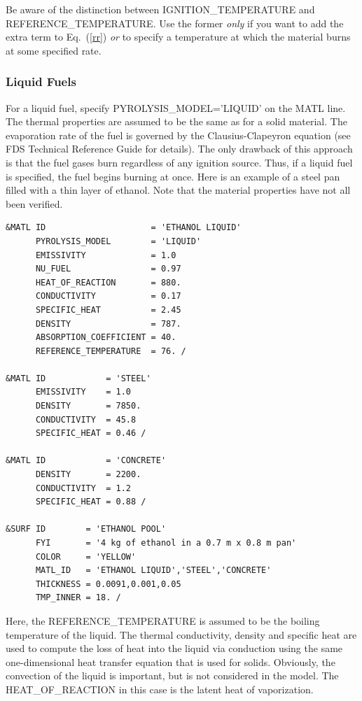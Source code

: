 \documentclass[11pt]{book}
\begin{document}
\begin{warning}
Be aware of the distinction between {\ct IGNITION\_TEMPERATURE} and {\ct REFERENCE\_TEMPERATURE}.
Use the former {\em only} if you want to add the extra term to Eq.~(\ref{rr}) {\em or} to specify a temperature
at which the material burns at some specified rate.
\end{warning}


\subsubsection{Liquid Fuels}

For a liquid fuel, specify {\ct PYROLYSIS\_MODEL='LIQUID'} on the
{\ct MATL} line. The thermal properties are assumed to be the same as for a solid
material. The evaporation rate of the fuel
is governed by the Clausius-Clapeyron equation (see FDS Technical Reference
Guide for details). The only drawback of
this approach is that the fuel gases burn regardless of any ignition
source. Thus, if a liquid fuel is specified, the fuel
begins burning at once. Here is an example of a steel pan filled with a thin layer of ethanol. Note that the material
properties have not all been verified.

\footnotesize
\begin{verbatim}
&MATL ID                     = 'ETHANOL LIQUID'
      PYROLYSIS_MODEL        = 'LIQUID'
      EMISSIVITY             = 1.0
      NU_FUEL                = 0.97
      HEAT_OF_REACTION       = 880.
      CONDUCTIVITY           = 0.17
      SPECIFIC_HEAT          = 2.45
      DENSITY                = 787.
      ABSORPTION_COEFFICIENT = 40.
      REFERENCE_TEMPERATURE  = 76. /

&MATL ID            = 'STEEL'
      EMISSIVITY    = 1.0
      DENSITY       = 7850.
      CONDUCTIVITY  = 45.8
      SPECIFIC_HEAT = 0.46 /

&MATL ID            = 'CONCRETE'
      DENSITY       = 2200.
      CONDUCTIVITY  = 1.2
      SPECIFIC_HEAT = 0.88 /

&SURF ID        = 'ETHANOL POOL'
      FYI       = '4 kg of ethanol in a 0.7 m x 0.8 m pan'
      COLOR     = 'YELLOW'
      MATL_ID   = 'ETHANOL LIQUID','STEEL','CONCRETE'
      THICKNESS = 0.0091,0.001,0.05
      TMP_INNER = 18. /
\end{verbatim} \normalsize

\noindent
Here, the {\ct REFERENCE\_TEMPERATURE} is assumed to be the boiling temperature of
the liquid. The thermal conductivity, density and specific heat are used
to compute the loss of heat into the liquid via conduction using the
same one-dimensional heat transfer equation that is used for solids. Obviously,
the convection of the liquid is important, but is not considered in the model. The {\ct HEAT\_OF\_REACTION} in this
case is the latent heat of vaporization.
\end{document}
